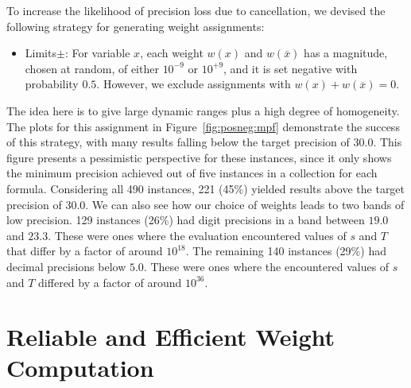 \documentclass[
hf
]{ceurart}
\newcommand{\obar}[1]{\overline{#1}}
\begin{document}
To increase the likelihood of precision loss due to cancellation, we devised the following strategy for generating weight assignments:
\begin{itemize}
\item\textsf{Limits$\pm$}:  For variable $x$, each weight $w(x)$ and $w(\obar{x})$ has a magnitude, chosen at random, of either $10^{-9}$ or $10^{+9}$, and it is set negative with probability $0.5$.
  However, we exclude assignments with $w(x) + w(\obar{x}) = 0$.
\end{itemize}
The idea here is to give large dynamic ranges plus a high degree of
homogeneity.  The plots for this assignment in
Figure~\ref{fig:posneg:mpf} demonstrate the success of this strategy,
with many results falling below the target precision of $30.0$.
This figure
 presents a pessimistic
perspective for these instances, since it only shows the minimum
precision achieved out of five instances in a collection for each formula.  Considering all 490
instances,
221 (45\%) yielded results above the
target precision of $30.0$.  We can also see how our choice of weights
leads to two bands of low precision.  129 instances (26\%) had digit
precisions in a band between $19.0$ and $23.3$.  These were ones where
the evaluation encountered values of $s$ and $T$ that
differ by a factor of around $10^{18}$.  The remaining 140 instances
(29\%) had decimal precisions below $5.0$.  These were ones where the
encountered values of $s$ and $T$ differed by a factor of around
 $10^{36}$.

\section{Reliable and Efficient Weight Computation}
\label{sect:reliable}
\end{document}
